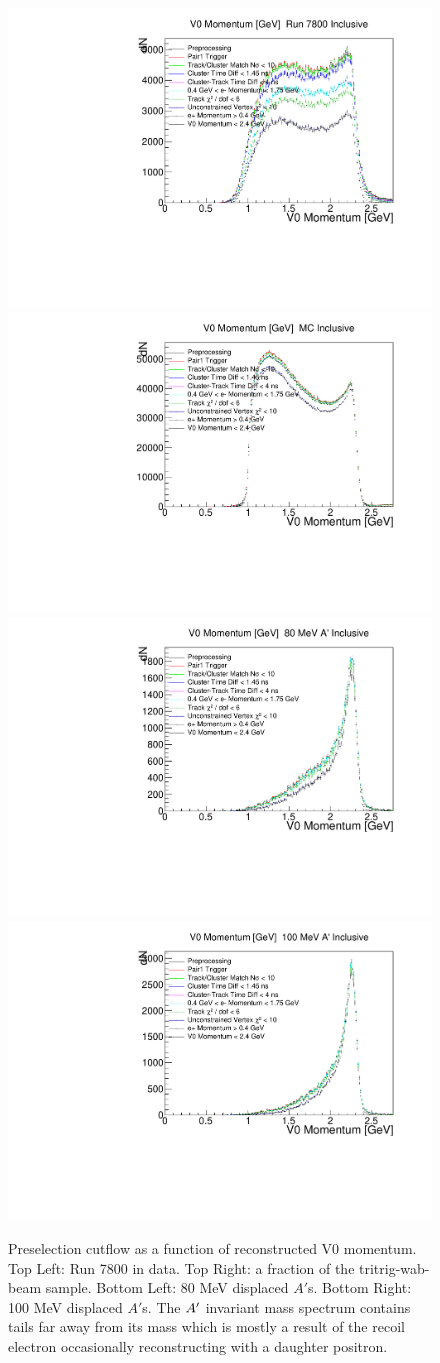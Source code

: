 \begin{figure}[t]
    \centering
    \includegraphics[width=.45\textwidth]{figs/recon/pre_cutflow_uncP_data.pdf}
    \includegraphics[width=.45\textwidth]{figs/recon/pre_cutflow_uncP_mc.pdf}
    \includegraphics[width=.45\textwidth]{figs/recon/pre_cutflow_uncP_ap80.pdf}
    \includegraphics[width=.45\textwidth]{figs/recon/pre_cutflow_uncP_ap100.pdf}
    \caption{Preselection cutflow as a function of reconstructed V0 momentum. Top Left: Run 7800 in data. Top Right: a fraction of the tritrig-wab-beam sample. Bottom Left: 80 MeV displaced $A'$s. Bottom Right: 100 MeV displaced $A'$s. The $A^\prime$ invariant mass spectrum contains tails far away from its mass which is mostly a result of the recoil electron occasionally reconstructing with a daughter positron.}
    \label{fig:pre_cutflow_p}
\end{figure}

